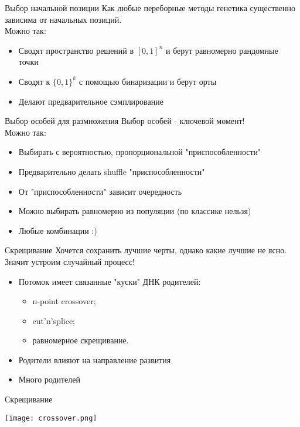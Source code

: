 \documentclass[14pt, fleqn, xcolor={dvipsnames, table}]{beamer}
\begin{document}
\begin{frame}{Выбор начальной позиции}
Как любые переборные методы генетика существенно зависима от начальных позиций. \\
Можно так:
\begin{itemize}
  \item Сводят пространство решений в $[0,1]^n$ и берут равномерно рандомные точки
  \item Сводят к $\{0,1\}^k$ с помощью бинаризации и берут орты
  \item Делают предварительное сэмплирование
\end{itemize}
\end{frame}

\begin{frame}{Выбор особей для размножения}
Выбор особей - ключевой момент! \\
Можно так:
\begin{itemize}
  \item Выбирать с вероятностью, пропорциональной "приспособленности"
  \item Предварительно делать shuffle "приспособленности"
  \item От "приспособленности" зависит очередность
  \item Можно выбирать равномерно из популяции (по классике нельзя)
  \item Любые комбинации :)
\end{itemize}
\end{frame}

\begin{frame}{Скрещивание}
Хочется сохранить лучшие черты, однако какие лучшие не ясно. Значит устроим случайный процесс!
\begin{itemize}
  \item Потомок имеет связанные "куски" ДНК родителей:
  \begin{itemize}
    \item n-point crossover;
    \item cut'n'splice;
    \item равномерное скрещивание.
  \end{itemize}
  \item Родители влияют на направление развития
  \item Много родителей
\end{itemize}
\end{frame}


\begin{frame}{Скрещивание}
\begin{center}
\texttt{[image: crossover.png]}
\end{center}
\end{frame}
\end{document}
